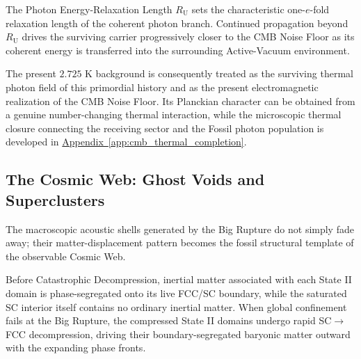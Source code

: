 The Photon Energy-Relaxation Length $R_{\mathrm U}$ sets the characteristic one-$e$-fold relaxation length of the coherent photon branch. Continued propagation beyond $R_{\mathrm U}$ drives the surviving carrier progressively closer to the CMB Noise Floor as its coherent energy is transferred into the surrounding Active-Vacuum environment.

The present $2.725$ K background is consequently treated as the surviving thermal photon field of this primordial history and as the present electromagnetic realization of the CMB Noise Floor. Its Planckian character can be obtained from a genuine number-changing thermal interaction, while the microscopic thermal closure connecting the receiving sector and the Fossil photon population is developed in
\hyperref[app:cmb_thermal_completion]{Appendix~\ref*{app:cmb_thermal_completion}}.

\subsection{The Cosmic Web: Ghost Voids and Superclusters}
\label{sec:cosmic_web_formation}

The macroscopic acoustic shells generated by the Big Rupture do not simply fade away; their matter-displacement pattern becomes the fossil structural template of the observable Cosmic Web.

Before Catastrophic Decompression, inertial matter associated with each State II domain is phase-segregated onto its live FCC/SC boundary, while the saturated SC interior itself contains no ordinary inertial matter. When global confinement fails at the Big Rupture, the compressed State II domains undergo rapid SC$\rightarrow$FCC decompression, driving their boundary-segregated baryonic matter outward with the expanding phase fronts.

